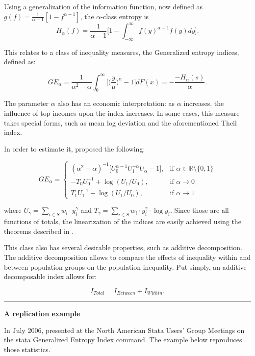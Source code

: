 \documentclass[]{book}
\begin{document}
Using a generalization of the information function, now defined as \(g(f) = \frac{1}{\alpha-1} [ 1 - f^{\alpha - 1} ]\), the \(\alpha\)-class entropy is
\[
H_\alpha(f) = \frac{1}{\alpha - 1} \bigg[ 1 - \int_{-\infty}^{\infty} f(y)^{ \alpha - 1} f(y) dy \bigg] \text{.}
\]

This relates to a class of inequality measures, the Generalized entropy indices, defined as:

\[
GE_\alpha = \frac{1}{\alpha^2 - \alpha} \int_{0}^\infty \bigg[ \bigg( \frac{y}{\mu} \bigg)^\alpha - 1 \bigg]dF(x) = - \frac{-H_\alpha(s) }{ \alpha } \text{.}
\]

The parameter \(\alpha\) also has an economic interpretation: as \(\alpha\) increases, the influence of top incomes upon the index increases. In some cases, this measure takes special forms, such as mean log deviation and the aforementioned Theil index.

In order to estimate it, \citet{biewen2003} proposed the following:

\[
GE_\alpha =
\begin{cases}
( \alpha^2 - \alpha)^{-1} \big[ U_0^{\alpha - 1} U_1^{-\alpha} U_\alpha -1 \big], & \text{if } \alpha \in \mathbb{R} \setminus \{0,1\} \\
- T_0 U_0^{-1} + \log ( U_1 / U_0 ), &\text{if } \alpha \rightarrow 0 \\
T_1 U_1^{-1} - \log ( U_1 / U_0 ), & \text{if } \alpha \rightarrow 1
\end{cases}
\]

where \(U_\gamma = \sum_{i \in S} w_i \cdot y_i^\gamma\) and \(T_\gamma = \sum_{i \in S} w_i \cdot y_i^\gamma \cdot \log y_i\). Since those are all functions of totals, the linearization of the indices are easily achieved using the theorems described in \citet{deville1999}.

This class also has several desirable properties, such as additive decomposition. The additive decomposition allows to compare the effects of inequality within and between population groups on the population inequality. Put simply, an additive decomposable index allows for:

\[
I_{Total} = I_{Between} + I_{Within} \text{.}
\]

\begin{center}\rule{0.5\linewidth}{0.5pt}\end{center}

\textbf{A replication example}

In July 2006, \citet{jenkins2006} presented at the North American Stata Users' Group Meetings on the stata Generalized Entropy Index command. The example below reproduces those statistics.
\end{document}
